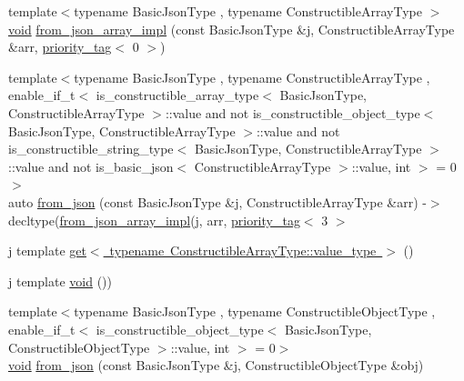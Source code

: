 \begin{DoxyCompactItemize}
\item 
{\footnotesize template$<$typename Basic\+Json\+Type , typename Constructible\+Array\+Type $>$ }\\\mbox{\hyperlink{namespacenlohmann_1_1detail_a59fca69799f6b9e366710cb9043aa77d}{void}} \mbox{\hyperlink{namespacenlohmann_1_1detail_a20cf21255e75cff1ffb0869c2c545e63}{from\+\_\+json\+\_\+array\+\_\+impl}} (const Basic\+Json\+Type \&j, Constructible\+Array\+Type \&arr, \mbox{\hyperlink{structnlohmann_1_1detail_1_1priority__tag}{priority\+\_\+tag}}$<$ 0 $>$)
\item 
{\footnotesize template$<$typename Basic\+Json\+Type , typename Constructible\+Array\+Type , enable\+\_\+if\+\_\+t$<$ is\+\_\+constructible\+\_\+array\+\_\+type$<$ Basic\+Json\+Type, Constructible\+Array\+Type $>$\+::value and not is\+\_\+constructible\+\_\+object\+\_\+type$<$ Basic\+Json\+Type, Constructible\+Array\+Type $>$\+::value and not is\+\_\+constructible\+\_\+string\+\_\+type$<$ Basic\+Json\+Type, Constructible\+Array\+Type $>$\+::value and not is\+\_\+basic\+\_\+json$<$ Constructible\+Array\+Type $>$\+::value, int $>$  = 0$>$ }\\auto \mbox{\hyperlink{namespacenlohmann_1_1detail_a14d8cdf544585f1c38eab6a0820e55f7}{from\+\_\+json}} (const Basic\+Json\+Type \&j, Constructible\+Array\+Type \&arr) -\/$>$ decltype(\mbox{\hyperlink{namespacenlohmann_1_1detail_a40f7bb070a60e8ba14fffb9c117fcbd8}{from\+\_\+json\+\_\+array\+\_\+impl}}(j, arr, \mbox{\hyperlink{structnlohmann_1_1detail_1_1priority__tag}{priority\+\_\+tag}}$<$ 3 $>$
\item 
j template \mbox{\hyperlink{namespacenlohmann_1_1detail_ad9e016d7b6a3cd2847027950aa0aac3b}{get$<$ typename Constructible\+Array\+Type\+::value\+\_\+type $>$}} ()
\item 
j template \mbox{\hyperlink{namespacenlohmann_1_1detail_a59fca69799f6b9e366710cb9043aa77d}{void}} ())
\item 
{\footnotesize template$<$typename Basic\+Json\+Type , typename Constructible\+Object\+Type , enable\+\_\+if\+\_\+t$<$ is\+\_\+constructible\+\_\+object\+\_\+type$<$ Basic\+Json\+Type, Constructible\+Object\+Type $>$\+::value, int $>$  = 0$>$ }\\\mbox{\hyperlink{namespacenlohmann_1_1detail_a59fca69799f6b9e366710cb9043aa77d}{void}} \mbox{\hyperlink{namespacenlohmann_1_1detail_a5b24896e5f5db6af06d939dde4b63fe1}{from\+\_\+json}} (const Basic\+Json\+Type \&j, Constructible\+Object\+Type \&obj)
\item 

\end{DoxyCompactItemize}
